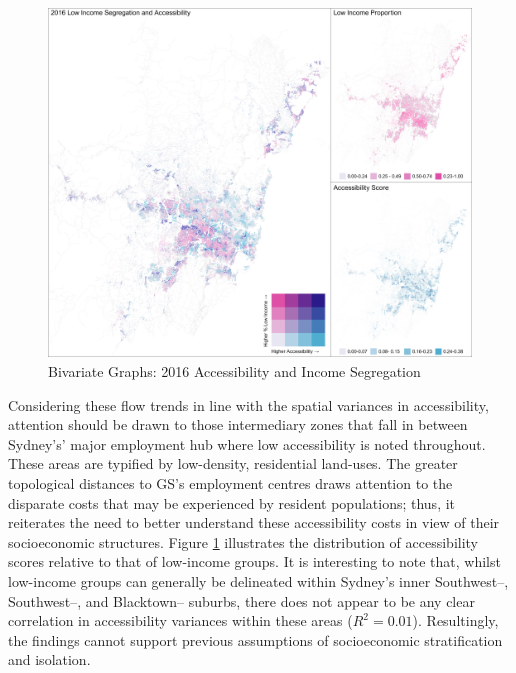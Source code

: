 \begin{figure}
    \includegraphics[width=1\textwidth]{body/figures/low_inc_16.png}
    \caption{Bivariate Graphs: 2016 Accessibility and Income Segregation}
    \label{fig:access_income}
\end{figure}

Considering these flow trends in line with the spatial variances in accessibility, attention should be drawn to those intermediary zones that fall in between Sydney's' major employment hub where low accessibility is noted throughout. These areas are typified by low-density, residential land-uses. The greater topological distances to GS's employment centres draws attention to the disparate costs that may be experienced by resident populations; thus, it reiterates the need to better understand these accessibility costs in view of their socioeconomic structures.  Figure \ref{fig:access_income} illustrates the distribution of accessibility scores relative to that of low-income groups. It is interesting to note that, whilst low-income groups can generally be delineated within Sydney's inner Southwest--, Southwest--, and Blacktown-- suburbs, there does not appear to be any clear correlation in accessibility variances within these areas ($R^2=0.01$). Resultingly, the findings cannot support previous assumptions of socioeconomic stratification and isolation. \\

